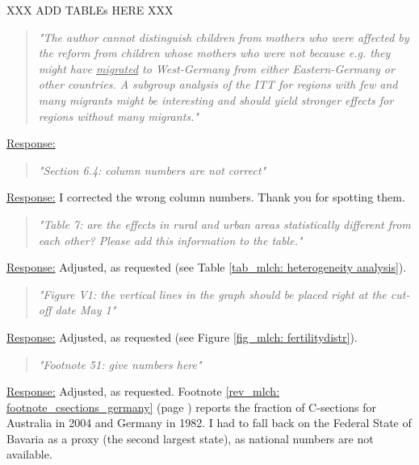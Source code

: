 XXX ADD TABLEs HERE XXX

% 
\begin{quote}
	\textit{"The author cannot distinguish children from mothers who were affected by the reform from children whose mothers who were not because e.g. they might have \underline{migrated} to West-Germany from either Eastern-Germany or other countries. A subgroup analysis of the ITT for regions with few and many migrants might be interesting and should yield stronger effects for regions without many migrants."}
\end{quote}
\underline{Response:}

% 
\begin{quote}
	\textit{"Section 6.4: column numbers are not correct"}
\end{quote}
\underline{Response:} I corrected the wrong column numbers. Thank you for spotting them.

% 
\begin{quote}
	\textit{"Table 7: are the effects in rural and urban areas statistically different from each other? Please add this information to the table."}
\end{quote}
\underline{Response:} Adjusted, as requested (see Table \ref{tab_mlch: heterogeneity analysis}).

% 
\begin{quote}
	\textit{"Figure V1: the vertical lines in the graph should be placed right at the cut-off date May 1"}
\end{quote}
\underline{Response:} Adjusted, as requested (see Figure \ref{fig_mlch: fertilitydistr}).

% 
\begin{quote}
	\textit{"Footnote 51: give numbers here"}
\end{quote}
\underline{Response:} Adjusted, as requested. Footnote \ref{rev_mlch: footnote_csections_germany} (page \pageref{rev_mlch: footnote_csections_germany}) reports the fraction of C-sections for Australia in 2004 and Germany in 1982. I had to fall back on the Federal State of Bavaria as a proxy (the second largest state), as national numbers are not available.

